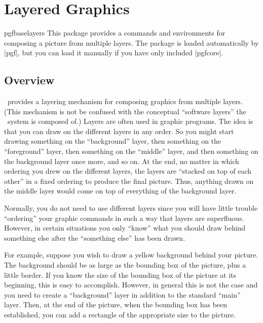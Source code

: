%


\section{Layered Graphics}

\label{section-layers}

\begin{package}{pgfbaselayers}
  This package provides a commands and environments for composing a
  picture from multiple layers. The package is loaded automatically by
  |pgf|, but you can load it manually if you have only included
  |pgfcore|.   
\end{package}



\subsection{Overview}

\pgfname\ provides a layering mechanism for composing graphics from
multiple layers. (This mechanism is not be confused with the
conceptual ``software layers'' the \pgfname\ system is composed of.)
Layers are often used in graphic programs. The idea is that you can
draw on the different layers in any order. So you might start drawing
something on the ``background'' layer, then something on the
``foreground'' layer, then something on the ``middle'' layer, and then
something on the background layer once more, and so on. At the end, no
matter in which ordering you drew on the different layers, the layers
are ``stacked on top of each other'' in a fixed ordering to produce
the final picture. Thus, anything drawn on the middle layer would come
on top of everything of the background layer.

Normally, you do not need to use different layers since you will have
little trouble ``ordering'' your graphic commands in such a way that
layers are superfluous. However, in certain situations you only
``know'' what you should draw behind something else after the
``something else'' has been drawn.

For example, suppose you wish to draw a yellow background behind your
picture. The background should be as large as the bounding box of the
picture, plus a little border. If you know the size of the bounding box
of the picture at its beginning, this is easy to accomplish. However,
in general this is not the case and you need to create a
``background'' layer in addition to the standard ``main'' layer. Then,
at the end of the picture, when the bounding box has been established,
you can add a rectangle of the appropriate size to the picture.



